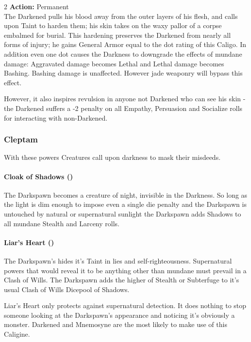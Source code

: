 \begin{multicols}{2}
\noindent \textbf{Action:} Permanent\\

The Darkened pulls his blood away from the outer layers of his flesh, and calls upon Taint to harden them; his skin takes on the waxy pallor of a corpse embalmed for burial. This hardening preserves the Darkened from nearly all forms of injury; he gains General Armor equal to the dot rating of this Caligo. In addition even one dot causes the Darkness to downgrade the effects of mundane damage: Aggravated damage becomes Lethal and Lethal damage becomes Bashing. Bashing damage is unaffected. However jade weaponry will bypass this effect.

However, it also inspires revulsion in anyone not Darkened who can see his skin - the Darkened suffers a -2 penalty on all Empathy, Persuasion and Socialize rolls for interacting with non-Darkened.

\subsubsection*{Cleptam}

With these powers Creatures call upon darkness to mask their misdeeds. 

\paragraph*{Cloak of Shadows (\textbullet)}

\noindent The Darkspawn becomes a creature of night, invisible in the Darkness. So long as the light is dim enough to impose even a single die penalty and the Darkspawn is untouched by natural or supernatural sunlight the Darkspawn adds Shadows to all mundane Stealth and Larceny rolls.

\paragraph*{Liar’s Heart (\textbullet)}

\noindent The Darkspawn's hides it's Taint in lies and self-righteousness. Supernatural powers that would reveal it to be anything other than mundane must prevail in a Clash of Wills. The Darkspawn adds the higher of Stealth or Subterfuge to it's usual Clash of Wills Dicepool of Shadows. 

Liar's Heart only protects against supernatural detection. It does nothing to stop someone looking at the Darkspawn's appearance and noticing it's obviously a monster. Darkened and Mnemosyne are the most likely to make use of this Caligine. 


\end{multicols}

